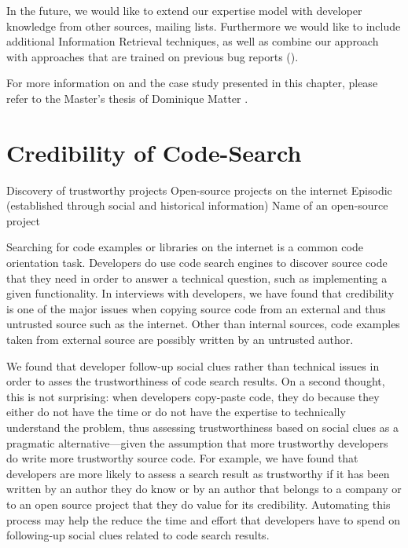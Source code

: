 In the future, we would like to extend our expertise model with developer knowledge from other sources, \eg mailing lists. Furthermore we would like to include additional Information Retrieval techniques, as well as combine our approach with approaches that are trained on previous bug reports (\eg \cite{Anvi06a, Canf05a, Cubr04b, Lucc02a}).

For more information on \DEVLECT and the case study presented in this chapter, please refer to the Master's thesis of Dominique Matter \cite{Matt09a}.



\chapter{Credibility of Code-Search}
\label{the chapter on codesearch}

\infobox
	{Discovery of trustworthy projects}
	{Open-source projects on the internet}
	{Episodic (established through social and historical information)}
	{Name of an open-source project}

Searching for code examples or libraries on the internet is a common code orientation task. Developers do use code search engines to discover source code that they need in order to answer a technical question, such as implementing a given functionality. In interviews with developers, we have found that credibility is one of the major issues when copying source code from an external and thus untrusted source such as the internet. Other than internal sources, code examples taken from external source are possibly written by an untrusted author.

We found that developer follow-up social clues rather than technical issues in order to asses the trustworthiness of code search results. On a second thought, this is not surprising: when developers copy-paste code, they do because they either do not have the time or do not have the expertise to technically understand the problem, thus assessing trustworthiness based on social clues as a pragmatic alternative---given the assumption that more trustworthy developers do write more trustworthy source code. For example, we have found that developers are more likely to assess a search result as trustworthy if it has been written by an author they do know or by an author that belongs to a company or to an open source project that they do value for its credibility. Automating this process may help the reduce the time and effort that developers have to spend on following-up social clues related to code search results.

